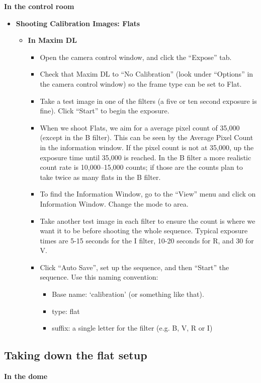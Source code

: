 \documentclass[letterpaper, 12pt]{report}
\newcommand{\location}[1]{\noindent\large{\textbf{#1}}}
\newcommand{\indome}{\location{In the dome}}
\newcommand{\incontrol}{\location{In the control room}}
\begin{document}
\incontrol
\begin{itemize}
	\item {\large \textbf{Shooting Calibration Images: Flats}}
	\begin{itemize}
		\item {\large \textbf{In Maxim DL}}
		\begin{itemize}
			\item Open the camera control window, and click the ``Expose'' tab.
			\item Check that Maxim DL to ``No Calibration'' (look under ``Options'' in the camera control window) so the frame type can be set to Flat.
			\item Take a test image in one of the filters (a five or ten second exposure is fine). Click ``Start'' to begin the exposure.
			\item When we shoot Flats, we aim for a average pixel count of 35,000 (except in the B filter). This can be seen by the Average Pixel Count in the information window. If the pixel count is not at 35,000, up the exposure time until 35,000 is reached. In the B filter a more realistic count rate is 10,000--15,000 counts; if those are the counts plan to take twice as many flats in the B filter.
			\item To find the Information Window, go to the ``View'' menu and click on Information Window. Change the mode to area.
			\item Take another test image in each filter to ensure the count is where we want it to be before shooting the whole sequence. Typical exposure times are 5-15 seconds for the I filter, 10-20 seconds for R, and 30 for V.
			\item Click ``Auto Save'', set up the sequence, and then ``Start'' the sequence. Use this naming convention:
			\begin{itemize}
				\item Base name: `calibration' (or something like that).
				\item type: flat
				\item suffix: a single letter for the filter (e.g. B, V, R or I)
			\end{itemize}
		\end{itemize}
	\end{itemize}
\end{itemize}

\subsection{Taking down the flat setup}
\indome
\end{document}
